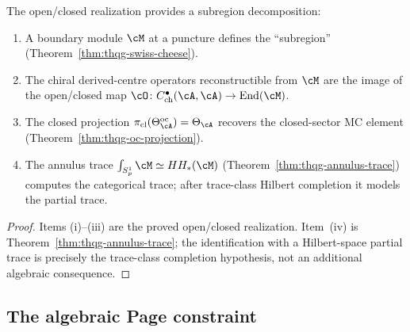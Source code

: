 \begin{theorem}
\label{thm:thqg-entanglement-wedge}
The open/closed realization provides a subregion decomposition:
\begin{enumerate}[label=\textup{(\roman*)}]
\item A boundary module $\cM$ at a puncture defines the
 ``subregion'' (Theorem~\ref{thm:thqg-swiss-cheese}).

\item The chiral derived-centre operators reconstructible from $\cM$
 are the image of the open/closed map
 $\cO \colon C^\bullet_{\mathrm{ch}}(\cA, \cA) \to
 \operatorname{End}(\cM)$.

\item The closed projection
 $\pi_{\mathrm{cl}}(\Theta^{\mathrm{oc}}_\cA) = \Theta_\cA$
 recovers the closed-sector MC element
 (Theorem~\ref{thm:thqg-oc-projection}).

\item The annulus trace
 $\int_{S^1_p} \cM \simeq HH_*(\cM)$
 (Theorem~\ref{thm:thqg-annulus-trace})
 computes the categorical trace; after trace-class Hilbert completion
 it models the partial trace.
\end{enumerate}
\end{theorem}

\begin{proof}
Items \textup{(i)--(iii)} are the proved open/closed realization.
Item~\textup{(iv)} is Theorem~\ref{thm:thqg-annulus-trace}; the
identification with a Hilbert-space partial trace is precisely the
trace-class completion hypothesis, not an additional algebraic
consequence.
\end{proof}

%
%

\subsection{The algebraic Page constraint}
\label{subsec:thqg-entanglement-page}


